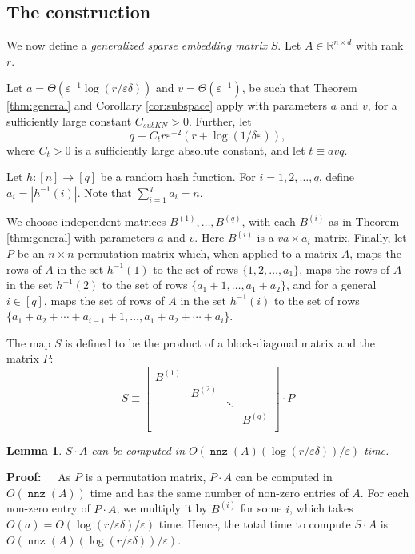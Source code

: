 \documentclass{sig-alternate}
\DeclareMathOperator{\nnz}{\mathtt{nnz}}
\newcommand\kv{a}
\newcommand\gdelta{\delta}
\newcommand{\eps}{\varepsilon}
\newtheorem{lemma}[theorem]{Lemma}
\def\FullBox{\hbox{\vrule width 8pt height 8pt depth 0pt}}
\def\qed{\ifmmode\qquad\FullBox\else{\unskip\nobreak\hfil
\penalty50\hskip1em\null\nobreak\hfil\FullBox
\parfillskip=0pt\finalhyphendemerits=0\endgraf}\fi}
\newenvironment{proof}{\begin{trivlist} \item {\bf Proof:~~}}
  {\qed\end{trivlist}}
\begin{document}
\subsection{The construction}
We now define a {\it generalized sparse embedding matrix} $S$. 
Let $A \in \mathbb{R}^{n \times d}$ with rank $r$. 


Let $\kv = \Theta(\eps^{-1} \log (r/\eps\gdelta))$ and
$v = \Theta(\eps^{-1})$,  be such that Theorem \ref{thm:general} 
and Corollary \ref{cor:subspace} apply
with parameters $\kv$ and $v$, for a sufficiently large constant $C_{subKN} > 0$.  
Further, let $$q \equiv C_t r \eps^{-2}(r+\log(1/\gdelta\eps)),$$ 
where $C_t > 0$ is a sufficiently large absolute constant, 
and let $t \equiv avq$. 

Let $h:[n] \rightarrow [q]$ be a random hash function. For $i = 1, 2, \ldots, q$, 
define $a_i = |h^{-1}(i)|$. Note that $\sum_{i=1}^q a_i = n$. 

We choose independent matrices 
$B^{(1)}, \ldots, B^{(q)}$, with each $B^{(i)}$ as in Theorem \ref{thm:general} 
with parameters $\kv$ and $v$. Here $B^{(i)}$ is a $v\kv \times a_i$ matrix. Finally, 
let $P$ be an $n \times n$ permutation matrix which, when applied to a matrix $A$, maps the rows
of $A$ in the set $h^{-1}(1)$
to the set of rows $\{1, 2, \ldots, a_1\}$, maps the rows of $A$ in the set $h^{-1}(2)$ to the
set of rows $\{a_1+1, \ldots, a_1+a_2\}$, and for a general $i \in [q]$,
maps the set of rows of $A$ in the set $h^{-1}(i)$ 
to the set of rows $\{a_1+a_2 + \cdots + a_{i-1}+1, \ldots, a_1 + a_2 + \cdots + a_i\}$. 

The map $S$ is defined to be the product of a block-diagonal matrix and the
matrix $P$:
\[
S \equiv \left[
\begin{matrix}
B^{(1)} & &\\
& B^{(2)} &&\\
&& \ddots & \\
&&& B^{(q)} \\
\end{matrix}
\right] \cdot P
\]

\begin{lemma}\label{lem:time}
$S \cdot A$ can be computed in $O(\nnz(A) (\log (r/\eps\gdelta)) / \eps)$ time.
\end{lemma}
\begin{proof}
As $P$ is a permutation matrix, $P \cdot A$ can be computed in $O(\nnz(A))$ time and has
the same number of non-zero entries of $A$. For each non-zero entry of $P \cdot A$,
we multiply it by $B^{(i)}$ for some $i$, which takes $O(\kv) = O(\log(r/\eps\gdelta)/\eps)$ time. Hence, the total time
to compute $S \cdot A$ is $O(\nnz(A) (\log (r/\eps\gdelta)) / \eps)$. 
\end{proof}
\end{document}
